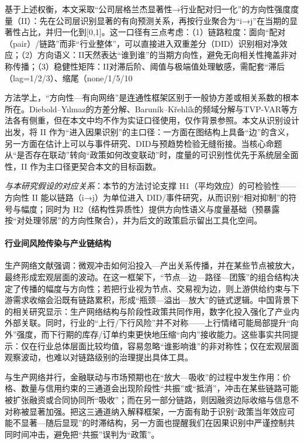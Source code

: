 基于上述权衡，本文采取“公司层格兰杰显著性→行业配对归一化”的方向性强度度量（II）：先在公司层识别显著的有向预测关系，再按行业聚合为“i→j”在当期的显著性占比，并归一化到[0,1]。这一口径有三点考虑：（1）链路粒度：面向“配对（pair）/链路”而非“行业整体”，可以直接进入双重差分（DID）识别相对净效应；（2）方向语义：II天然表达“谁到谁”的当期方向性，避免无向相关性掩盖非对称传播；（3）稳健性矩阵：II对滞后阶、阈值与极端值处理敏感，需配套“滞后（lag=1/2/3）、缩尾（none/1/5/10%

方法学上，“方向性—有向网络”是连通性框架区别于一般协方差或相关系数的根本所在。Diebold–Yılmaz的方差分解、Baruník–Křehlík的频域分解与TVP‑VAR等方法各有侧重，但在本文中均不作为实证口径使用，仅作背景参照。本文从识别设计出发，将 II 作为“进入因果识别”的主口径：一方面在图结构上具备“边”的含义，另一方面在估计上可以与事件研究、DID与预趋势检验无缝衔接。当核心命题从“是否存在联动”转向“政策如何改变联动”时，度量的可识别性优先于系统层全面性，II 作为主口径更契合本文的目标函数。

\noindent\textit{与本研究假设的对应关系}：本节的方法讨论支撑 H1（平均效应）的可检验性——方向性 II 能以链路（i→j）为单位进入 DID/事件研究，从而识别“相对抑制”的符号与幅度；同时为 H2（结构性异质性）提供方向性语义与度量基础（预暴露按“对处理邻居”的方向性聚合），并为后文的政策启示留出工具化空间。
\paragraph{行业间风险传染与产业链结构}
生产网络文献强调：微观冲击如何沿投入—产出关系传播，并在某些节点被放大，最终形成宏观层面的波动\citep{acemoglu2012network,carvalho2014micro}。在这一框架下，“节点—边—路径—团簇”的组合结构决定了传播的幅度与方向性；若把行业视为节点、交易视为边，则上游供给约束与下游需求收缩会沿既有链路累积，形成“瓶颈—溢出—放大”的链式逻辑。中国背景下的相关研究显示：生产网络结构与阶段性政策共同作用，数字化投入强化了产业内外部关联\citep{Zhao2023DigitalInputNetwork}。同时，行业的“上行/下行风险”并不对称——上行情绪可能局部提升“向外”强度，而下行期的库存/订单约束更快地压缩“向内”接收能力\citep{Li2024UpsideDownsideSpillover}。这些事实共同提示：仅在行业总体层面比较均值，容易忽略“谁影响谁”的非对称性；仅在宏观层面观察波动，也难以对链路级别的治理提出具体工具。

与生产网络并行，金融联动与市场预期也在“放大—吸收”的过程中发生作用：价格、数量与信用约束的三通道会出现阶段性“共振”或“抵消”，冲击在某些链路可能被扩张融资或合同协同所“吸收”；而在另一部分链路，则因融资边际收缩与信息不对称被显著加强。把这三通道纳入解释框架，一方面有助于识别“政策当年效应可能不显著—随后显现”的时滞结构，另一方面也提醒我们在因果识别中严谨控制共同时间冲击，避免把“共振”误判为“政策”。

